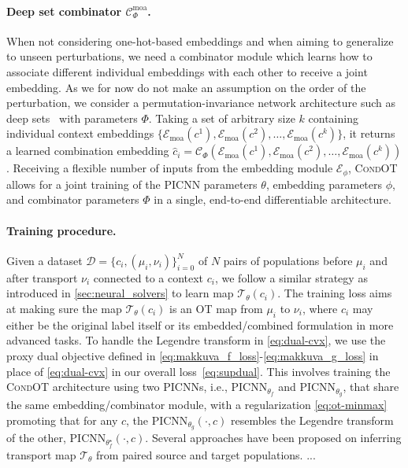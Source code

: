 \paragraph{Deep set combinator $\mathcal{C}^\text{moa}_\Phi$.}
When not considering one-hot-based embeddings and when aiming to generalize to unseen perturbations, we need a combinator module which learns how to associate different individual embeddings with each other to receive a joint embedding.
As we for now do not make an assumption on the order of the perturbation, we consider a permutation-invariance network architecture such as deep sets~\citep{zaheer2017deep} with parameters $\Phi$. Taking a set of arbitrary size $k$ containing individual context embeddings $\{\mathcal{E}_\text{moa}(c^1), \mathcal{E}_\text{moa}(c^2), \dots, \mathcal{E}_\text{moa}(c^k)\}$, it returns a learned combination embedding $\hat{c}_i = \mathcal{C}_\Phi(\mathcal{E}_\text{moa}(c^1), \mathcal{E}_\text{moa}(c^2), \dots, \mathcal{E}_\text{moa}(c^k))$.
Receiving a flexible number of inputs from the embedding module $\mathcal{E}_\phi$, \textsc{CondOT} allows for a joint training of the PICNN parameters $\theta$, embedding parameters $\phi$, and combinator parameters $\Phi$ in a single, end-to-end differentiable architecture.


\paragraph{Training procedure.}

 Given a dataset $\mathcal{D}=\{c_i, (\mu_i, \nu_i) \}_{i=0}^N$ of $N$ pairs of populations before $\mu_i$ and after transport $\nu_i$ connected to a context $c_i$, we follow a similar strategy as introduced in \cref{sec:neural_solvers} to learn map $\mathcal{T}_\theta(c_i)$. 
The training loss aims at making sure the map $\mathcal{T}_\theta(c_i)$ is an OT map from $\mu_i$ to $\nu_i$, where $c_i$ may either be the original label itself or its embedded/combined formulation in more advanced tasks. To handle the Legendre transform in \eqref{eq:dual-cvx}, we use the proxy dual objective defined in \citep[Eq. 6]{makkuva2020optimal} \eqref{eq:makkuva_f_loss}-\eqref{eq:makkuva_g_loss} in place of \eqref{eq:dual-cvx} in our overall loss~\eqref{eq:supdual}.
This involves training the \textsc{CondOT} architecture using two PICNNs, i.e., $\text{PICNN}_{\theta_f}$ and $\text{PICNN}_{\theta_g}$, that share the same embedding/combinator module, with a regularization \eqref{eq:ot-minmax} promoting that for any $c$, the $\text{PICNN}_{\theta_g}(\cdot,c)$ resembles the Legendre transform of the other, $\text{PICNN}_{\theta_f^\star}(\cdot,c)$.
Several approaches have been proposed on inferring transport map $\mathcal{T}_{\theta}$ from paired source and target populations. ...

